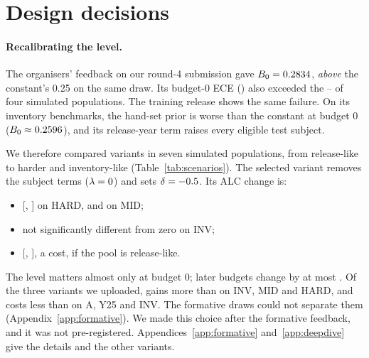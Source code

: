\documentclass{article}
\begin{document}
\section{Design decisions}
\label{sec:why}

\paragraph{Recalibrating the level.} The organisers' feedback on our round-4 submission \FmShipId{} gave $B_0=0.2834$, \emph{above} the constant's 0.25 on the same draw. Its budget-0 ECE (\FmShipEceBZero) also exceeded the \DdEceBZeroShipMin--\DdEceBZeroShipMax{} of four simulated populations. The training release shows the same failure. On its \DdPopNInvBench{} inventory benchmarks, the hand-set prior is worse than the constant at budget 0 ($B_0\approx0.2596$), and its release-year term raises every eligible test subject.

We therefore compared variants in seven simulated populations, from release-like to harder and inventory-like (Table~\ref{tab:scenarios}). The selected variant \SelId{} removes the subject terms ($\lambda=0$) and sets $\delta=-0.5$. Its ALC change is:
\begin{itemize}
\item \DdHardSelMean{} [\DdHardSelLo, \DdHardSelHi] on HARD, and \DdMidSelMean{} on MID;
\item not significantly different from zero on INV;
\item \DdASelMean{} [\DdASelLo, \DdASelHi], a cost, if the pool is release-like.
\end{itemize}
The level matters almost only at budget 0; later budgets change by at most \DdSelMaxDeltaLater. Of the three variants we uploaded, \SelId{} gains more than \FmNosubjId{} on INV, MID and HARD, and costs less than \FmMhundId{} on A, Y25 and INV. The formative draws could not separate them (Appendix~\ref{app:formative}). We made this choice after the formative feedback, and it was not pre-registered. Appendices~\ref{app:formative} and~\ref{app:deepdive} give the details and the other variants.
\end{document}
